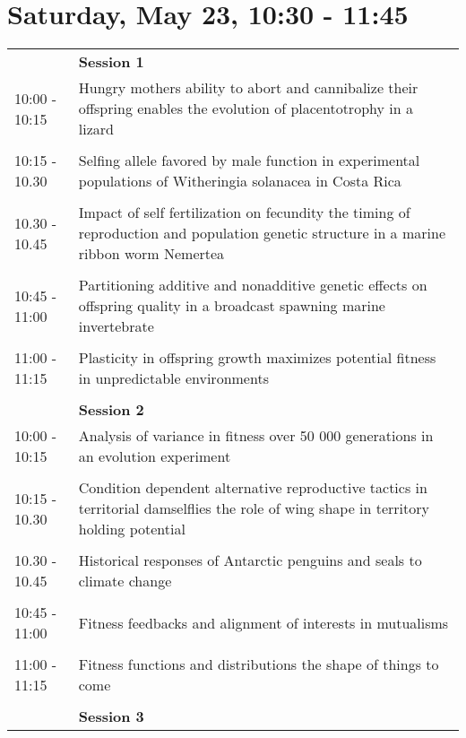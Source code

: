 \documentclass{article}
\begin{document}
\section{Saturday, May 23, 10:30 - 11:45}
\begin{longtabu} to \textwidth {lX}
 & \textbf{Session 1} \\ 

10:00 - 10:15 & Hungry mothers ability to abort and cannibalize their offspring enables the evolution of placentotrophy in a lizard \\ 
 &  \\ 
10:15 - 10.30 & Selfing allele favored by male function in experimental populations of Witheringia solanacea in Costa Rica \\ 
 &  \\ 
10.30 - 10.45 & Impact of self fertilization on fecundity  the timing of reproduction  and population genetic structure  in a marine ribbon worm  Nemertea \\ 
 &  \\ 
10:45 - 11:00 & Partitioning additive and nonadditive genetic effects on offspring quality in a broadcast spawning marine invertebrate \\ 
 &  \\ 
11:00 - 11:15 & Plasticity in offspring growth maximizes potential fitness in unpredictable environments \\ 
 &  \\ 
 & \textbf{Session 2} \\ 

10:00 - 10:15 & Analysis of variance in fitness over 50 000 generations in an evolution experiment \\ 
 &  \\ 
10:15 - 10.30 & Condition dependent alternative reproductive tactics in territorial damselflies  the role of wing shape in territory holding potential \\ 
 &  \\ 
10.30 - 10.45 & Historical responses of Antarctic penguins and seals to climate change \\ 
 &  \\ 
10:45 - 11:00 & Fitness feedbacks and alignment of interests in mutualisms \\ 
 &  \\ 
11:00 - 11:15 & Fitness functions and distributions  the shape of things to come \\ 
 &  \\ 
 & \textbf{Session 3} \\ 


\end{longtabu}
\end{document}
